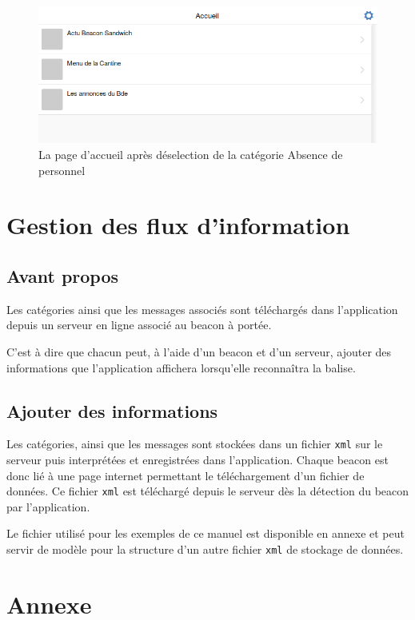 \documentclass{report}
\begin{document}
\begin{figure}[h]
	\centering
	\includegraphics[scale=0.28]{accueilPerso.png}
	\caption{La page d'accueil après déselection de la catégorie \og Absence de personnel \fg}
\end{figure}

\chapter{Gestion des flux d'information}

\section{Avant propos}

Les catégories ainsi que les messages associés sont téléchargés dans l'application depuis un serveur en ligne associé au beacon à portée. 

C'est à dire que chacun peut, à l'aide d'un beacon et d'un serveur, ajouter des informations que l'application affichera lorsqu'elle reconnaîtra la balise.

\section{Ajouter des informations}

Les catégories, ainsi que les messages sont stockées dans un fichier \texttt{xml} sur le serveur puis interprétées et enregistrées dans l'application. Chaque beacon est donc lié à une page internet permettant le téléchargement d'un fichier de données.
Ce fichier \texttt{xml} est téléchargé depuis le serveur dès la détection du beacon par l'application.

Le fichier utilisé pour les exemples de ce manuel est disponible en annexe et peut servir de modèle pour la structure d'un autre fichier \texttt{xml} de stockage de données.


\chapter{Annexe}
\end{document}
